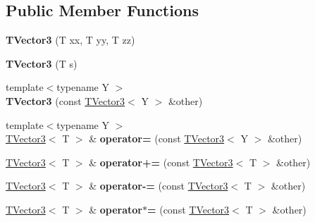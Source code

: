 \subsection*{Public Member Functions}
\begin{DoxyCompactItemize}
\item 
{\bfseries T\+Vector3} (T xx, T yy, T zz)\hypertarget{classAudio_1_1TVector3_a3b0844e60b064252fc9950842a50adaa}{}\label{classAudio_1_1TVector3_a3b0844e60b064252fc9950842a50adaa}

\item 
{\bfseries T\+Vector3} (T s)\hypertarget{classAudio_1_1TVector3_a2396058d098f85d6ebcdad63230bdd0f}{}\label{classAudio_1_1TVector3_a2396058d098f85d6ebcdad63230bdd0f}

\item 
{\footnotesize template$<$typename Y $>$ }\\{\bfseries T\+Vector3} (const \hyperlink{classAudio_1_1TVector3}{T\+Vector3}$<$ Y $>$ \&other)\hypertarget{classAudio_1_1TVector3_a69692596ddc92e17b1b92b4c27c054ee}{}\label{classAudio_1_1TVector3_a69692596ddc92e17b1b92b4c27c054ee}

\item 
{\footnotesize template$<$typename Y $>$ }\\\hyperlink{classAudio_1_1TVector3}{T\+Vector3}$<$ T $>$ \& {\bfseries operator=} (const \hyperlink{classAudio_1_1TVector3}{T\+Vector3}$<$ Y $>$ \&other)\hypertarget{classAudio_1_1TVector3_a62df58f34b6334d399cc11813a263412}{}\label{classAudio_1_1TVector3_a62df58f34b6334d399cc11813a263412}

\item 
\hyperlink{classAudio_1_1TVector3}{T\+Vector3}$<$ T $>$ \& {\bfseries operator+=} (const \hyperlink{classAudio_1_1TVector3}{T\+Vector3}$<$ T $>$ \&other)\hypertarget{classAudio_1_1TVector3_a749ce73ad408b2c05a0985f540e410a8}{}\label{classAudio_1_1TVector3_a749ce73ad408b2c05a0985f540e410a8}

\item 
\hyperlink{classAudio_1_1TVector3}{T\+Vector3}$<$ T $>$ \& {\bfseries operator-\/=} (const \hyperlink{classAudio_1_1TVector3}{T\+Vector3}$<$ T $>$ \&other)\hypertarget{classAudio_1_1TVector3_a485810c3af096e4303924d306f300d50}{}\label{classAudio_1_1TVector3_a485810c3af096e4303924d306f300d50}

\item 
\hyperlink{classAudio_1_1TVector3}{T\+Vector3}$<$ T $>$ \& {\bfseries operator$\ast$=} (const \hyperlink{classAudio_1_1TVector3}{T\+Vector3}$<$ T $>$ \&other)\hypertarget{classAudio_1_1TVector3_a9b9966cb6f017751a1462fa97bd3e7b3}{}\label{classAudio_1_1TVector3_a9b9966cb6f017751a1462fa97bd3e7b3}


\end{DoxyCompactItemize}
